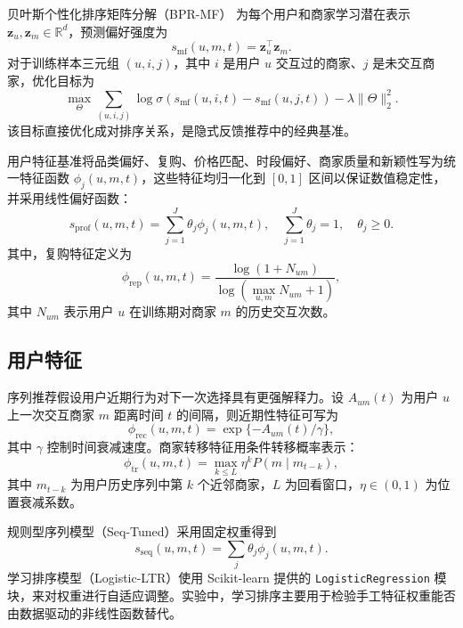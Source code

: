 \documentclass[12pt,a4paper]{article}
\begin{document}
    贝叶斯个性化排序矩阵分解（BPR-MF）\cite{rendle2009bpr} 为每个用户和商家学习潜在表示 $\mathbf{z}_u,\mathbf{z}_m\in\mathbb{R}^d$，预测偏好强度为
    \begin{equation}
        s_{\mathrm{mf}}(u,m,t)=\mathbf{z}_u^{\top}\mathbf{z}_m.
    \end{equation}
    对于训练样本三元组 $(u,i,j)$，其中 $i$ 是用户 $u$ 交互过的商家、$j$ 是未交互商家，优化目标为
    \begin{equation}
        \max_{\Theta}\sum_{(u,i,j)}\log \sigma\left(s_{\mathrm{mf}}(u,i,t)-s_{\mathrm{mf}}(u,j,t)\right)-\lambda\|\Theta\|_2^2.
    \end{equation}
    该目标直接优化成对排序关系，是隐式反馈推荐中的经典基准。

    用户特征基准将品类偏好、复购、价格匹配、时段偏好、商家质量和新颖性写为统一特征函数 $\phi_j(u,m,t)$，这些特征均归一化到 $[0,1]$ 区间以保证数值稳定性，并采用线性偏好函数：
    \begin{equation}
        s_{\mathrm{prof}}(u,m,t)=\sum_{j=1}^{J}\theta_j\phi_j(u,m,t),\quad \sum_{j=1}^{J}\theta_j=1,\quad \theta_j\ge 0.
    \end{equation}
    其中，复购特征定义为
    \begin{equation}
        \phi_{\mathrm{rep}}(u,m,t)=\frac{\log(1+N_{um})}{\log {(\max_{u,m}{N_{um}}+1)}},
    \end{equation}
    其中 $N_{um}$ 表示用户 $u$ 在训练期对商家 $m$ 的历史交互次数。

    \subsection{用户特征}

    序列推荐假设用户近期行为对下一次选择具有更强解释力。设 $A_{um}(t)$ 为用户 $u$ 上一次交互商家 $m$ 距离时间 $t$ 的间隔，则近期性特征可写为
    \begin{equation}
        \phi_{\mathrm{rec}}(u,m,t)=\exp\{-A_{um}(t)/\gamma\},
    \end{equation}
    其中 $\gamma$ 控制时间衰减速度。商家转移特征用条件转移概率表示：
    \begin{equation}
        \phi_{\mathrm{tr}}(u,m,t)=\max_{k\le L}\eta^k P(m\mid m_{t-k}),
    \end{equation}
    其中 $m_{t-k}$ 为用户历史序列中第 $k$ 个近邻商家，$L$ 为回看窗口，$\eta\in(0,1)$ 为位置衰减系数。

    规则型序列模型（Seq-Tuned）采用固定权重得到
    \begin{equation}
        s_{\mathrm{seq}}(u,m,t)=\sum_{j}\theta_j\phi_j(u,m,t).
    \end{equation}
    学习排序模型（Logistic-LTR）使用 Scikit-learn\cite{pedregosa2011sklearn} 提供的 \verb|LogisticRegression| 模块，来对权重进行自适应调整。实验中，学习排序主要用于检验手工特征权重能否由数据驱动的非线性函数替代。
\end{document}
